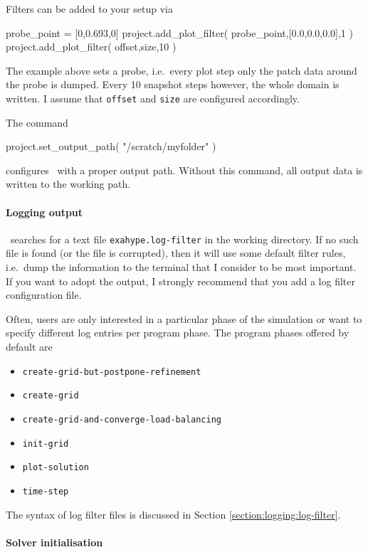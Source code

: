\noindent
Filters can be added to your setup via
\begin{code}
probe_point = [0,0.693,0]
project.add_plot_filter( probe_point,[0.0,0.0,0.0],1 )
project.add_plot_filter( offset,size,10 )
\end{code}

\noindent
The example above sets a probe, i.e.~every plot step only the patch data around
the probe is dumped. Every 10 snapshot steps however, the whole domain is
written.
I assume that \texttt{offset} and \texttt{size} are configured accordingly.


The command
\begin{code}
project.set_output_path( "/scratch/myfolder" )
\end{code}
\noindent
configures \Peano\ with a proper output path. Without this command, all output
data is written to the working path.


\paragraph{Logging output}

\ExaHyPE\ searches for a text file \texttt{exahype.log-filter} in the working
directory.
If no such file is found (or the file is corrupted), then it will use some
default filter rules, i.e.~dump the information to the terminal that I consider
to be most important.
If you want to adopt the output, I strongly recommend that you add a log filter
configuration file. 


Often, users are only interested in a particular phase of the simulation or want 
to specify different log entries per program phase. The program phases offered
by default are
\begin{itemize}
  \item \texttt{create-grid-but-postpone-refinement}
  \item \texttt{create-grid}
  \item \texttt{create-grid-and-converge-load-balancing}
  \item \texttt{init-grid}
  \item \texttt{plot-solution}
  \item \texttt{time-step}
\end{itemize}

\noindent
The syntax of log filter files is discussed in Section
\ref{section:logging:log-filter}.


\paragraph{Solver initialisation}

